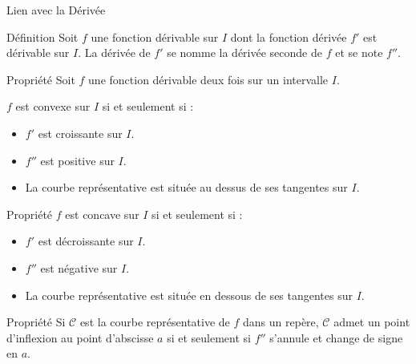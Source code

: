 \documentclass{cours}
\begin{document}
    \begin{Gpartie}{Lien avec la Dérivée} 
        \begin{Spartie}{Définition} 
            Soit $f$ une fonction dérivable sur $I$ dont la fonction dérivée $f'$ est dérivable sur $I$. La dérivée de $f'$ se nomme la dérivée seconde de $f$ et se note $f''$.
        \end{Spartie}
        \begin{Spartie}{Propriété} 
            Soit $f$ une fonction dérivable deux fois sur un intervalle $I$.

            $f$ est convexe sur $I$ si et seulement si :
            \begin{itemize}
                \item $f'$ est croissante sur $I$.
                \item $f''$ est positive sur $I$.
                \item La courbe représentative est située au dessus de ses tangentes sur $I$.
            \end{itemize}
        \end{Spartie}
        \pagebreak
        \begin{Spartie}{Propriété} 
            $f$ est concave sur $I$ si et seulement si :
            \begin{itemize}
                \item $f'$ est décroissante sur $I$.
                \item $f''$ est négative sur $I$.
                \item La courbe représentative est située en dessous de ses tangentes sur $I$.
            \end{itemize}
        \end{Spartie}
        \begin{Spartie}{Propriété} 
            Si $\mathcal{C}$ est la courbe représentative de $f$ dans un repère, $\mathcal{C}$ admet un point d'inflexion au point d'abscisse $a$ si et seulement si $f''$ s'annule et change de signe en $a$.


\end{Spartie}
\end{Gpartie}
\end{document}
